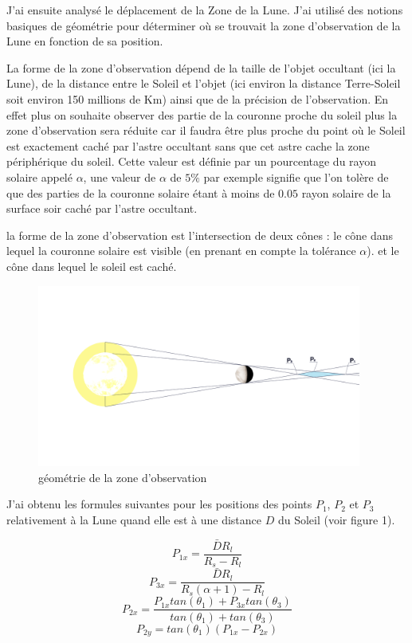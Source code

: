 \documentclass[12pt]{article} %
\begin{document}
		J'ai ensuite analysé le déplacement de la \gls{Zone} de la Lune. J'ai utilisé des notions basiques de géométrie pour déterminer où se trouvait la zone d'observation de la Lune en fonction de sa position.
		
		La forme de la zone d'observation dépend de la taille de l'objet occultant (ici la Lune), de la distance entre le Soleil et l'objet (ici environ la distance Terre-Soleil soit environ 150 millions de Km) ainsi que de la précision de l'observation. En effet plus on souhaite observer des partie de la couronne proche du soleil plus la zone d'observation sera réduite car il faudra être plus proche du point où le Soleil est exactement caché par l'astre occultant sans que cet astre cache la zone périphérique du soleil. Cette valeur est définie par un pourcentage du rayon solaire appelé $\alpha$, une valeur de $\alpha$ de $5\%$ par exemple signifie que l'on tolère de que des parties de la couronne solaire étant à moins de $0.05$ rayon solaire de la surface soir caché par l'astre occultant.
		
		la forme de la zone d'observation est l'intersection de deux cônes : le cône dans lequel la couronne solaire est visible (en prenant en compte la tolérance $\alpha$). et le cône dans lequel le soleil est caché.
		
		\begin{figure}[H]
			\includegraphics[width=0.95\textwidth]{images/moon_schem.png}
			\caption{géométrie de la zone d'observation}
		\end{figure}
		
		J'ai obtenu les formules suivantes pour les positions des points $P_1$, $P_2$ et $P_3$ relativement à la Lune quand elle est à une distance $D$ du Soleil (voir figure 1).
		
		$$	
		P_{1x}=\frac{\bar{D}R_l}{R_s-R_l}
		$$ 
		$$	
		P_{3x}=\frac{\bar{D}R_l}{R_s(\alpha+1)-R_l}
		$$
		$$
		P_{2x}=\frac{P_{1x}tan(\theta_1) + P_{3x}tan(\theta_3)}{tan(\theta_1) + tan(\theta_3)}
		$$
		$$
		P_{2y}=tan(\theta_1)(P_{1x}-P_{2x})
		$$
		
\end{document}
